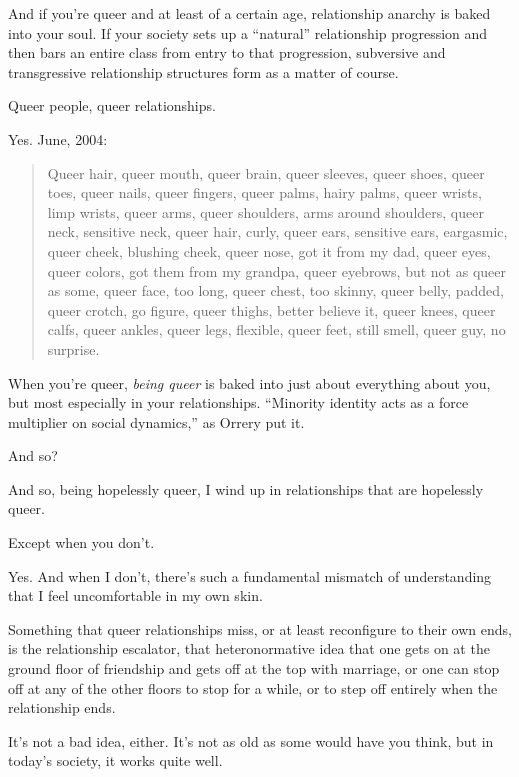 \begin{paracol}{2}
\begin{leftcolumn}
And if you're queer and at least of a certain age, relationship anarchy is baked into your soul. If your society sets up a ``natural'' relationship progression and then bars an entire class from entry to that progression, subversive and transgressive relationship structures form as a matter of course.

\begin{ally}
Queer people, queer relationships.
\end{ally}
Yes. June, 2004:

\begin{quotation}
Queer hair, queer mouth, queer brain, queer sleeves, queer shoes, queer toes, queer nails, queer fingers, queer palms, hairy palms, queer wrists, limp wrists, queer arms, queer shoulders, arms around shoulders, queer neck, sensitive neck, queer hair, curly, queer ears, sensitive ears, eargasmic, queer cheek, blushing cheek, queer nose, got it from my dad, queer eyes, queer colors, got them from my grandpa, queer eyebrows, but not as queer as some, queer face, too long, queer chest, too skinny, queer belly, padded, queer crotch, go figure, queer thighs, better believe it, queer knees, queer calfs, queer ankles, queer legs, flexible, queer feet, still smell, queer guy, no surprise.
\end{quotation}

When you're queer, \emph{being queer} is baked into just about everything about you, but most especially in your relationships. ``Minority identity acts as a force multiplier on social dynamics,'' as Orrery put it.

\begin{ally}
And so?
\end{ally}
And so, being hopelessly queer, I wind up in relationships that are hopelessly queer.

\begin{ally}
Except when you don't.
\end{ally}
Yes. And when I don't, there's such a fundamental mismatch of understanding that I feel uncomfortable in my own skin.

Something that queer relationships miss, or at least reconfigure to their own ends, is the relationship escalator, that heteronormative idea that one gets on at the ground floor of friendship and gets off at the top with marriage, or one can stop off at any of the other floors to stop for a while, or to step off entirely when the relationship ends.

It's not a bad idea, either. It's not as old as some would have you think, but in today's society, it works quite well.


\end{leftcolumn}
\end{paracol}
